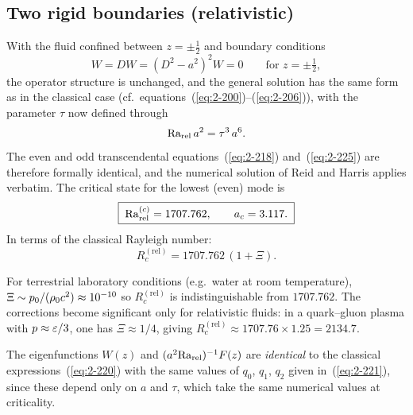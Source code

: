 \subsection{Two rigid boundaries (relativistic)}
\label{sec:rel-15b}

With the fluid confined between $z = \pm\tfrac{1}{2}$ and boundary
conditions
\begin{equation}
\label{eq:rel-15-bc-rigid}
W = DW = (D^{2}-a^{2})^{2}W = 0 \qquad\text{for } z = \pm\tfrac{1}{2},
\end{equation}
the operator structure is unchanged, and the general solution has the
same form as in the classical case (cf.\ equations~(\ref{eq:2-200})--(\ref{eq:2-206})),
with the parameter $\tau$ now defined through
\begin{equation}
\label{eq:rel-15-tau-rigid}
\mathrm{Ra}_{\mathrm{rel}}\,a^{2} = \tau^{3}\,a^{6}.
\end{equation}
The even and odd transcendental equations~(\ref{eq:2-218})
and~(\ref{eq:2-225}) are therefore formally identical, and the
numerical solution of Reid and Harris applies verbatim. The critical
state for the lowest (even) mode is
\begin{equation}
\label{eq:rel-15-Rcrigid}
\boxed{\;
\mathrm{Ra}_{\mathrm{rel}}^{(c)} = 1707.762, \qquad a_{c} = 3.117.
\;}
\end{equation}
In terms of the classical Rayleigh number:
\begin{equation}
\label{eq:rel-15-Rcrigid-classical}
R_{c}^{(\mathrm{rel})} = 1707.762\,(1+\Xi).
\end{equation}

For terrestrial laboratory conditions (e.g.\ water at room temperature),
$\Xi \sim p_{0}/(\rho_0 c^{2}) \approx 10^{-10}$ so $R_{c}^{(\mathrm{rel})}$ is indistinguishable
from $1707.762$. The corrections become significant only for
relativistic fluids: in a quark--gluon plasma with
$p \approx \varepsilon/3$, one has $\Xi \approx 1/4$, giving
$R_{c}^{(\mathrm{rel})} \approx 1707.76 \times 1.25 = 2134.7$.

The eigenfunctions $W(z)$ and $(a^{2}\mathrm{Ra}_{\mathrm{rel}})^{-1}F(z)$ are
\emph{identical} to the classical expressions~(\ref{eq:2-220}) with
the same values of $q_{0}$, $q_{1}$, $q_{2}$
given in~(\ref{eq:2-221}), since these depend only on $a$ and $\tau$,
which take the same numerical values at criticality.


